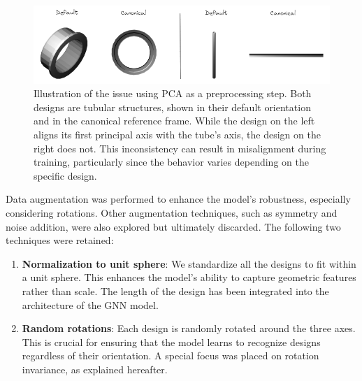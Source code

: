 \begin{figure}[]
    \centering
    \includegraphics[width=\columnwidth]{images/pca_problem.png}
    \caption{Illustration of the issue using PCA as a preprocessing step. Both designs are tubular structures, shown in their default orientation and in the canonical reference frame. While the design on the left aligns its first principal axis with the tube's axis, the design on the right does not. This inconsistency can result in misalignment during training, particularly since the behavior varies depending on the specific design.}
    \label{fig:pca_problem}
\end{figure}

Data augmentation was performed to enhance the model's robustness, especially considering rotations. Other augmentation techniques, such as symmetry and noise addition, were also explored but ultimately discarded. The following two techniques were retained:
\begin{enumerate}
    \item \textbf{Normalization to unit sphere}: We standardize all the designs to fit within a unit sphere. This enhances the model's ability to capture geometric features rather than scale. The length of the design has been integrated into the architecture of the GNN model.
    \item \textbf{Random rotations}: Each design is randomly rotated around the three axes. This is crucial for ensuring that the model learns to recognize designs regardless of their orientation. A special focus was placed on rotation invariance, as explained hereafter.
\end{enumerate}

